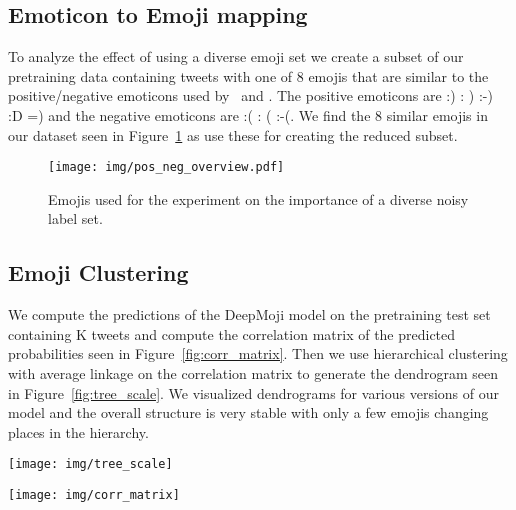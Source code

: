 \documentclass[11pt,a4paper]{article}
\begin{document}
\subsection{Emoticon to Emoji mapping}


To analyze the effect of using a diverse emoji set we create a subset of our pretraining data containing tweets with one of 8 emojis that are similar to the positive/negative emoticons used by~\citet{tang2014learning} and \citet{hu2013unsupervised}. The positive emoticons are :) : ) :-) :D =) and the negative emoticons are :( : ( :-(. We find the 8 similar emojis in our dataset seen in Figure~\ref{fig:pos_neg_overview} as use these for creating the reduced subset.

\begin{figure}[hpt]
  \centering
  \texttt{[image: img/pos\_neg\_overview.pdf]}
  \caption{Emojis used for the experiment on the importance of a diverse noisy label set.}
  \label{fig:pos_neg_overview}
\end{figure}

\subsection{Emoji Clustering}

We compute the predictions of the DeepMoji model on the pretraining test set containing K tweets and compute the correlation matrix of the predicted probabilities seen in Figure~\ref{fig:corr_matrix}. Then we use hierarchical clustering with average linkage on the correlation matrix to generate the dendrogram seen in Figure~\ref{fig:tree_scale}. We visualized dendrograms for various versions of our model and the overall structure is very stable with only a few emojis changing places in the hierarchy.

\begin{figure*}[thp]
  \centering
  \texttt{[image: img/tree\_scale]}
  \caption{Hierarchical clustering of the DeepMoji model's predictions across categories on the test set. The dendrogram shows how the model learns to group emojis into overall categories and subcategories based on emotional content. The y-axis is the distance on the correlation matrix of the model's predictions measured using average linkage.}
  \label{fig:tree_scale}
\end{figure*}

\begin{figure*}[htp]
  \centering
  \texttt{[image: img/corr\_matrix]}
  \caption{Correlation matrix of the model's predictions on the pretraining test set.}
  \label{fig:corr_matrix}
\end{figure*}
\end{document}
